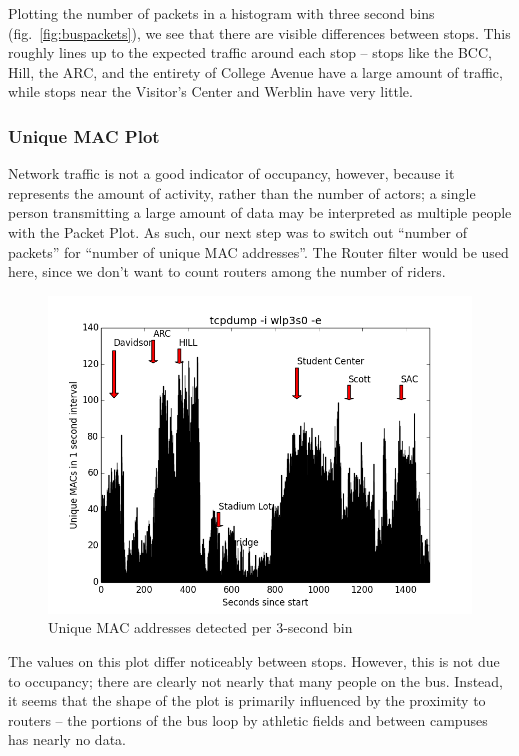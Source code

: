 Plotting the number of packets in a histogram with three second bins (fig.~\ref{fig:buspackets}), we see that there are visible differences between stops.
This roughly lines up to the expected traffic around each stop -- stops like the BCC, Hill, the ARC, and the entirety of College Avenue have a large amount of traffic, while stops near the Visitor's Center and Werblin have very little.

\subsubsection*{Unique MAC Plot}

Network traffic is not a good indicator of occupancy, however, because it represents the amount of activity, rather than the number of actors; a single person transmitting a large amount of data may be interpreted as multiple people with the Packet Plot.
As such, our next step was to switch out ``number of packets'' for ``number of unique MAC addresses''.
The Router filter would be used here, since we don't want to count routers among the number of riders.

\begin{figure}[!t]
  \includegraphics[width=\textwidth]{unique}
  \caption{Unique MAC addresses detected per 3-second bin}
  \label{fig:busunique}
\end{figure}

The values on this plot differ noticeably between stops.
However, this is not due to occupancy; there are clearly not nearly that many people on the bus.
Instead, it seems that the shape of the plot is primarily influenced by the proximity to routers -- the portions of the bus loop by athletic fields and between campuses has nearly no data.

